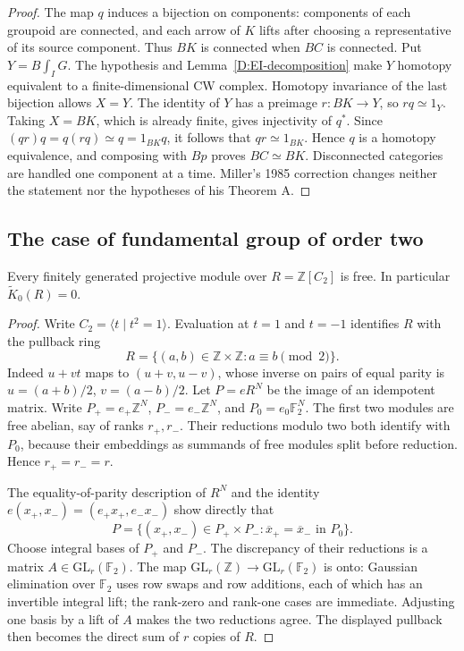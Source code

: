 \begin{proof}
The map $q$ induces a bijection on components: components of each
groupoid are connected, and each arrow of $K$ lifts after choosing a
representative of its source component.  Thus $BK$ is connected when
$BC$ is connected.  Put $Y=B\int_I G$.  The hypothesis and
Lemma~\ref{D:EI-decomposition} make $Y$ homotopy equivalent to a
finite-dimensional CW complex.  Homotopy invariance of the last
bijection allows $X=Y$.  The identity of $Y$ has a preimage
$r:BK\to Y$, so $rq\simeq1_Y$.  Taking $X=BK$, which is already
finite, gives injectivity of $q^*$.  Since
$(qr)q=q(rq)\simeq q=1_{BK}q$, it follows that $qr\simeq1_{BK}$.
Hence $q$ is a homotopy equivalence, and composing with $Bp$ proves
$BC\simeq BK$.  Disconnected categories are handled one component
at a time.  Miller's 1985 correction \cite{miller1985D} changes neither the statement
nor the hypotheses of his Theorem A.
\end{proof}

\subsection{The case of fundamental group of order two}

\begin{lemma}
\label{D:C2-K0}
Every finitely generated projective module over
$R=\mathbb Z[C_2]$ is free.  In particular
$\widetilde K_0(R)=0$.
\end{lemma}
\begin{proof}
Write $C_2=\langle t\mid t^2=1\rangle$.  Evaluation at $t=1$ and
$t=-1$ identifies $R$ with the pullback ring
\[
 R=\{(a,b)\in\mathbb Z\times\mathbb Z:a\equiv b\pmod2\}.
\]
Indeed $u+vt$ maps to $(u+v,u-v)$, whose inverse on pairs of equal
parity is $u=(a+b)/2$, $v=(a-b)/2$.
Let $P=eR^N$ be the image of an idempotent matrix.  Write
$P_+=e_+\mathbb Z^N$, $P_-=e_-\mathbb Z^N$, and
$P_0=e_0\mathbb F_2^N$.  The first two modules are free abelian,
say of ranks $r_+,r_-$.  Their reductions modulo two both identify
with $P_0$, because their embeddings as summands of free modules
split before reduction.  Hence $r_+=r_-=r$.

The equality-of-parity description of $R^N$ and the identity
$e(x_+,x_-)=(e_+x_+,e_-x_-)$ show directly that
\[
 P=\{(x_+,x_-)\in P_+\times P_-:
          \overline{x}_+=\overline{x}_-\text{ in }P_0\}.
\]
Choose integral bases of $P_+$ and $P_-$.  The discrepancy of their
reductions is a matrix $A\in\mathrm{GL}_r(\mathbb F_2)$.
The map $\mathrm{GL}_r(\mathbb Z)\to\mathrm{GL}_r(\mathbb F_2)$
is onto: Gaussian elimination over $\mathbb F_2$ uses row swaps and
row additions, each of which has an invertible integral lift; the
rank-zero and rank-one cases are immediate.  Adjusting one basis
by a lift of $A$ makes the two reductions agree.  The displayed
pullback then becomes the direct sum of $r$ copies of $R$.
\end{proof}

